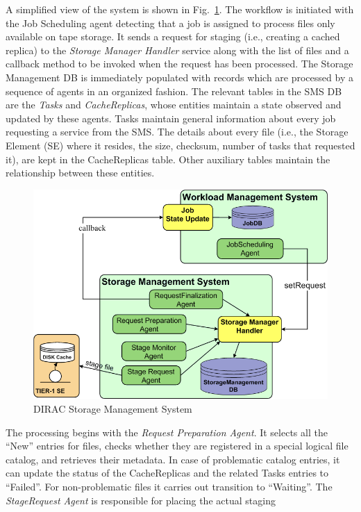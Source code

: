 \documentclass[10pt,conference]{IEEEtran}
\begin{document}
A simplified view of the system is shown in  Fig.~\ref{fig:DIRAC-SMS}. The workflow is initiated
with the Job Scheduling agent detecting that a job is assigned to process files
only available on tape storage. It sends a request for staging (i.e., creating a
cached replica) to the \textit{Storage Manager Handler} service along with the
list of files and a callback method to be invoked when the request has been
processed. The Storage Management DB is immediately populated with records which
are processed by a sequence of agents in an organized fashion. The relevant
tables in the SMS DB are the \textit{Tasks} and \textit{CacheReplicas}, whose
entities maintain a state observed and updated by these agents. Tasks maintain
general information about every job requesting a service from the SMS. The
details about every file (i.e., the Storage Element (SE) where it resides, the
size, checksum, number of tasks that requested it), are kept in the CacheReplicas
table. Other auxiliary tables maintain the relationship between these entities.
\begin{figure}[t]
\includegraphics[width=0.9\linewidth,keepaspectratio=true]{./SMS_simplified.png}
\centering
\caption{DIRAC Storage Management System}
\label{fig:DIRAC-SMS}
\end{figure}
The processing begins with the \textit{Request Preparation Agent}. It selects all the
“New” entries for files, checks whether they are registered in a special logical
file catalog, and retrieves their metadata. In case of problematic catalog
entries, it can update the status of the CacheReplicas and the related Tasks
entries to “Failed”. For non-problematic files it carries out transition to
“Waiting”. The \textit{StageRequest Agent} is responsible for placing the actual staging
\end{document}
